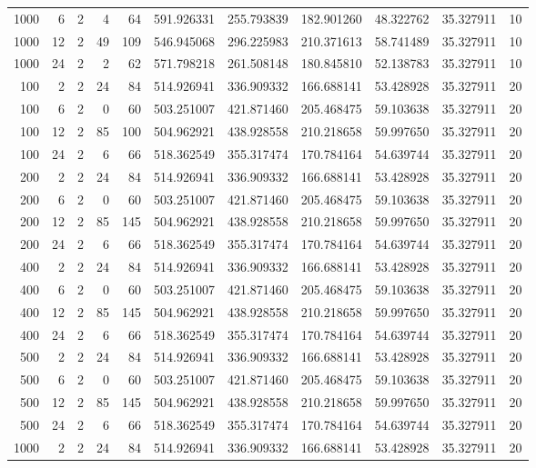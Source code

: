 \begin{table}
\begin{tabular}{rrrrrrrrrrr}
1000 & 6 & 2 & 4 & 64 & 591.926331 & 255.793839 & 182.901260 & 48.322762 & 35.327911 & 10 \\
1000 & 12 & 2 & 49 & 109 & 546.945068 & 296.225983 & 210.371613 & 58.741489 & 35.327911 & 10 \\
1000 & 24 & 2 & 2 & 62 & 571.798218 & 261.508148 & 180.845810 & 52.138783 & 35.327911 & 10 \\
100 & 2 & 2 & 24 & 84 & 514.926941 & 336.909332 & 166.688141 & 53.428928 & 35.327911 & 20 \\
100 & 6 & 2 & 0 & 60 & 503.251007 & 421.871460 & 205.468475 & 59.103638 & 35.327911 & 20 \\
100 & 12 & 2 & 85 & 100 & 504.962921 & 438.928558 & 210.218658 & 59.997650 & 35.327911 & 20 \\
100 & 24 & 2 & 6 & 66 & 518.362549 & 355.317474 & 170.784164 & 54.639744 & 35.327911 & 20 \\
200 & 2 & 2 & 24 & 84 & 514.926941 & 336.909332 & 166.688141 & 53.428928 & 35.327911 & 20 \\
200 & 6 & 2 & 0 & 60 & 503.251007 & 421.871460 & 205.468475 & 59.103638 & 35.327911 & 20 \\
200 & 12 & 2 & 85 & 145 & 504.962921 & 438.928558 & 210.218658 & 59.997650 & 35.327911 & 20 \\
200 & 24 & 2 & 6 & 66 & 518.362549 & 355.317474 & 170.784164 & 54.639744 & 35.327911 & 20 \\
400 & 2 & 2 & 24 & 84 & 514.926941 & 336.909332 & 166.688141 & 53.428928 & 35.327911 & 20 \\
400 & 6 & 2 & 0 & 60 & 503.251007 & 421.871460 & 205.468475 & 59.103638 & 35.327911 & 20 \\
400 & 12 & 2 & 85 & 145 & 504.962921 & 438.928558 & 210.218658 & 59.997650 & 35.327911 & 20 \\
400 & 24 & 2 & 6 & 66 & 518.362549 & 355.317474 & 170.784164 & 54.639744 & 35.327911 & 20 \\
500 & 2 & 2 & 24 & 84 & 514.926941 & 336.909332 & 166.688141 & 53.428928 & 35.327911 & 20 \\
500 & 6 & 2 & 0 & 60 & 503.251007 & 421.871460 & 205.468475 & 59.103638 & 35.327911 & 20 \\
500 & 12 & 2 & 85 & 145 & 504.962921 & 438.928558 & 210.218658 & 59.997650 & 35.327911 & 20 \\
500 & 24 & 2 & 6 & 66 & 518.362549 & 355.317474 & 170.784164 & 54.639744 & 35.327911 & 20 \\
1000 & 2 & 2 & 24 & 84 & 514.926941 & 336.909332 & 166.688141 & 53.428928 & 35.327911 & 20 \\

\end{tabular}
\end{table}
